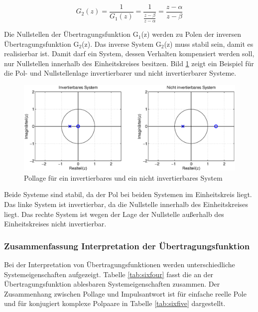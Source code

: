 \begin{equation}\label{eq:sixsonehundredthirteen}
G_{2} \left(z\right)=\frac{1}{G_{1} \left(z\right)} =\frac{1}{\frac{z-\beta }{z-\alpha } } =\frac{z-\alpha }{z-\beta}
\end{equation}

\noindent Die Nullstellen der \"{U}bertragungsfunktion G${}_{1}$(z) werden zu Polen der inversen \"{U}bertragungsfunktion G${}_{2}$(z). Das inverse System G${}_{2}$(z) muss stabil sein, damit es realisierbar ist. Damit darf ein System, dessen Verhalten kompensiert werden soll, nur Nullstellen innerhalb des Einheitskreises besitzen. Bild \ref{fig:SystemInvertierbar} zeigt ein Beispiel f\"{u}r die Pol- und Nullstellenlage invertierbarer und nicht invertierbarer Systeme.

\begin{figure}[H]
  \centerline{\includegraphics[width=1\textwidth]{Kapitel6/Bilder/image14.eps}}
  \caption{Pollage f\"{u}r ein invertierbares und ein nicht invertierbares System}
  \label{fig:SystemInvertierbar}
\end{figure}

\noindent Beide Systeme sind stabil, da der Pol bei beiden Systemen im Einheitskreis liegt. Das linke System ist invertierbar, da die Nullstelle innerhalb des Einheitskreises liegt. Das rechte System ist wegen der Lage der Nullstelle au{\ss}erhalb des Einheitskreises nicht invertierbar.
\clearpage
\subsubsection{Zusammenfassung Interpretation der \"{U}bertragungsfunktion}

\noindent Bei der Interpretation von \"{U}bertragungsfunktionen werden unterschiedliche Systemeigenschaften aufgezeigt. Tabelle \ref{tab:sixfour} fasst die an der \"{U}bertragungsfunktion ablesbaren Systemeigenschaften zusammen. Der Zusammenhang zwischen Pollage und Impulsantwort ist f\"{u}r einfache reelle Pole und f\"{u}r konjugiert komplexe Polpaare in Tabelle \ref{tab:sixfive} dargestellt.

